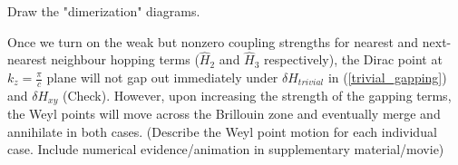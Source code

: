

{\color{red} Draw the "dimerization" diagrams.}


Once we turn on the weak but nonzero coupling strengths for nearest and next-nearest neighbour hopping terms ($\hat{H}_2$ and $\hat{H}_3$ respectively), the Dirac point at $k_z = \frac{\pi}{c}$ plane will not gap out immediately under $\delta H_{trivial}$ in (\ref{trivial_gapping}) and $\delta H_{xy}$ {\color{red}(Check)}. However, upon increasing the strength of the gapping terms, the Weyl points will move across the Brillouin zone and eventually merge and annihilate in both cases. {\color{red}(Describe the Weyl point motion for each individual case. Include numerical evidence/animation in supplementary material/movie)}






